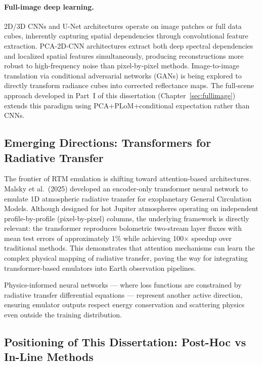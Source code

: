 \documentclass[11pt]{report}
\begin{document}
\paragraph{Full-image deep learning.}
2D/3D CNNs and U-Net architectures operate on image patches or full data cubes, inherently capturing spatial dependencies through convolutional feature extraction. PCA-2D-CNN architectures extract both deep spectral dependencies and localized spatial features simultaneously, producing reconstructions more robust to high-frequency noise than pixel-by-pixel methods. Image-to-image translation via conditional adversarial networks (GANs) is being explored to directly transform radiance cubes into corrected reflectance maps. The full-scene approach developed in Part~I of this dissertation (Chapter~\ref{sec:fullimage}) extends this paradigm using PCA+PLoM+conditional expectation rather than CNNs.

\subsection{Emerging Directions: Transformers for Radiative Transfer}

The frontier of RTM emulation is shifting toward attention-based architectures. Malsky et al.\ (2025) \cite{malsky2025} developed an encoder-only transformer neural network to emulate 1D atmospheric radiative transfer for exoplanetary General Circulation Models. Although designed for hot Jupiter atmospheres operating on independent profile-by-profile (pixel-by-pixel) columns, the underlying framework is directly relevant: the transformer reproduces bolometric two-stream layer fluxes with mean test errors of approximately 1\% while achieving 100$\times$ speedup over traditional methods. This demonstrates that attention mechanisms can learn the complex physical mapping of radiative transfer, paving the way for integrating transformer-based emulators into Earth observation pipelines.

Physics-informed neural networks --- where loss functions are constrained by radiative transfer differential equations --- represent another active direction, ensuring emulator outputs respect energy conservation and scattering physics even outside the training distribution.

\subsection{Positioning of This Dissertation: Post-Hoc vs In-Line Methods}
\end{document}
